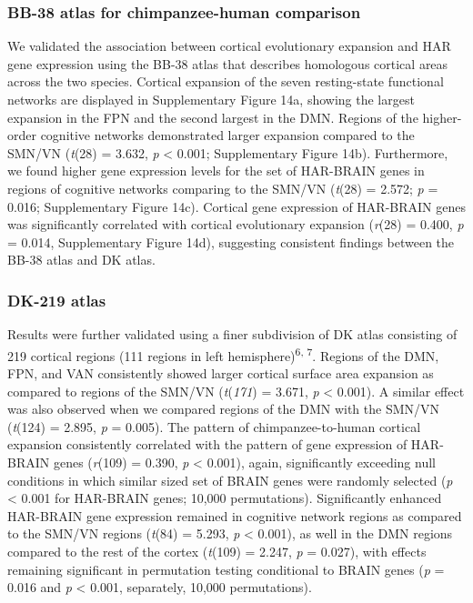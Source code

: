 \begin{refsection}
\subsubsection*{BB-38 atlas for chimpanzee-human comparison}
We validated the association between cortical evolutionary expansion and HAR gene expression using the BB-38 atlas that describes homologous cortical areas across the two species. Cortical expansion of the seven resting-state functional networks are displayed in Supplementary Figure 14a, showing the largest expansion in the FPN and the second largest in the DMN. Regions of the higher-order cognitive networks demonstrated larger expansion compared to the SMN/VN (\textit{t}(28) = 3.632, \textit{p} < 0.001; Supplementary Figure 14b). Furthermore, we found higher gene expression levels for the set of HAR-BRAIN genes in regions of cognitive networks comparing to the SMN/VN (\textit{t}(28) = 2.572; \textit{p} = 0.016; Supplementary Figure 14c). Cortical gene expression of HAR-BRAIN genes was significantly correlated with cortical evolutionary expansion (\textit{r}(28) = 0.400, \textit{p} = 0.014, Supplementary Figure 14d), suggesting consistent findings between the BB-38 atlas and DK atlas.

\subsubsection*{DK-219 atlas}
Results were further validated using a finer subdivision of DK atlas consisting of 219 cortical regions (111 regions in left hemisphere)\textsuperscript{6, 7}. Regions of the DMN, FPN, and VAN consistently showed larger cortical surface area expansion as compared to regions of the SMN/VN (\textit{t}(\textit{171}) = 3.671, \textit{p} < 0.001). A similar effect was also observed when we compared regions of the DMN with the SMN/VN (\textit{t}(124) = 2.895, \textit{p} = 0.005). The pattern of chimpanzee-to-human cortical expansion consistently correlated with the pattern of gene expression of HAR-BRAIN genes (\textit{r}(109) = 0.390, \textit{p} < 0.001), again, significantly exceeding null conditions in which similar sized set of BRAIN genes were randomly selected (\textit{p} < 0.001 for HAR-BRAIN genes; 10,000 permutations). Significantly enhanced HAR-BRAIN gene expression remained in cognitive network regions as compared to the SMN/VN regions (\textit{t}(84) = 5.293, \textit{p} < 0.001), as well in the DMN regions compared to the rest of the cortex (\textit{t}(109) = 2.247, \textit{p} = 0.027), with effects remaining significant in permutation testing conditional to BRAIN genes (\textit{p} = 0.016 and \textit{p} < 0.001, separately, 10,000 permutations).


\end{refsection}
